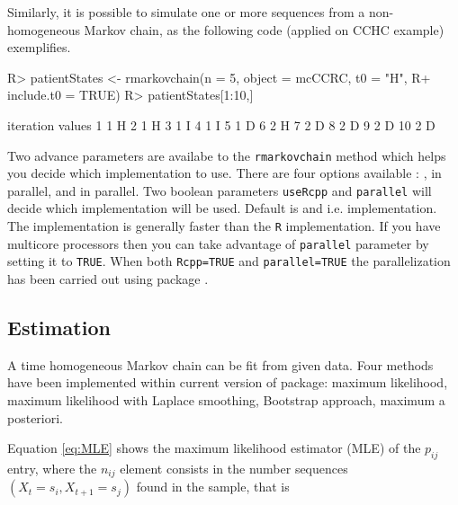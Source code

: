 \documentclass[
  nojss]{jss}
\begin{document}
Similarly, it is possible to simulate one or more sequences from a non-homogeneous Markov chain,
as the following code (applied on CCHC example) exemplifies.

\begin{CodeChunk}

\begin{CodeInput}
R> patientStates <- rmarkovchain(n = 5, object = mcCCRC, t0 = "H", 
R+                               include.t0 = TRUE)
R> patientStates[1:10,]
\end{CodeInput}

\begin{CodeOutput}
   iteration values
1          1      H
2          1      H
3          1      I
4          1      I
5          1      D
6          2      H
7          2      D
8          2      D
9          2      D
10         2      D
\end{CodeOutput}
\end{CodeChunk}

Two advance parameters are availabe to the \texttt{rmarkovchain} method which helps you decide which implementation to use. There are four options available : ,  in parallel,  and  in parallel. Two boolean parameters \texttt{useRcpp} and \texttt{parallel} will decide which implementation will be used. Default is  and  i.e.  implementation. The  implementation is generally faster than the \texttt{R} implementation. If you have multicore processors then you can take advantage of \texttt{parallel} parameter by setting it to \texttt{TRUE}. When both \texttt{Rcpp=TRUE} and \texttt{parallel=TRUE} the parallelization has been carried out using  package \citep{pkg:RcppParallel}.

\hypertarget{estimation}{%
\subsection{Estimation}\label{estimation}}

A time homogeneous Markov chain can be fit from given data. Four methods have been implemented within current version of  package: maximum likelihood, maximum likelihood with Laplace smoothing, Bootstrap approach, maximum a posteriori.

Equation \ref{eq:MLE} shows the maximum likelihood estimator (MLE) of the \(p_{ij}\) entry, where the \(n_{ij}\) element consists in the number sequences \(\left( X_{t}=s_{i}, X_{t+1}=s_{j}\right)\) found in the sample, that is
\end{document}
